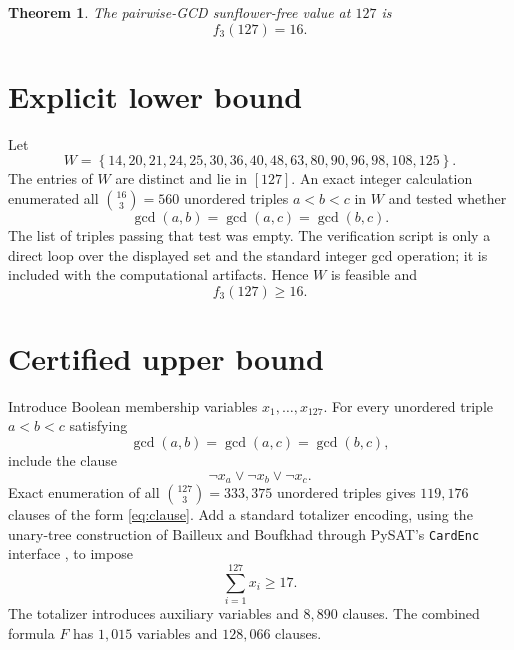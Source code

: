 \documentclass[11pt]{article}
\newtheorem{theorem}{Theorem}
\newcommand{\set}[1]{\left\{#1\right\}}
\begin{document}
\begin{theorem}\label{thm:main}
The pairwise-GCD sunflower-free value at $127$ is
\[
 f_3(127)=16.
\]
\end{theorem}

\section{Explicit lower bound}

Let
\begin{equation}\label{eq:witness}
 W=\set{14,20,21,24,25,30,36,40,48,63,80,90,96,98,108,125}.
\end{equation}
The entries of $W$ are distinct and lie in $[127]$.  An exact integer
calculation enumerated all $\binom{16}{3}=560$ unordered triples
$a<b<c$ in $W$ and tested whether
\[
 \gcd(a,b)=\gcd(a,c)=\gcd(b,c).
\]
The list of triples passing that test was empty.  The verification script is
only a direct loop over the displayed set and the standard integer gcd
operation; it is included with the computational artifacts.  Hence $W$ is
feasible and
\begin{equation}\label{eq:lower}
 f_3(127)\geq16.
\end{equation}

\section{Certified upper bound}

Introduce Boolean membership variables $x_1,\ldots,x_{127}$.  For every
unordered triple $a<b<c$ satisfying
\begin{equation}\label{eq:bad}
 \gcd(a,b)=\gcd(a,c)=\gcd(b,c),
\end{equation}
include the clause
\begin{equation}\label{eq:clause}
 \neg x_a\lor\neg x_b\lor\neg x_c.
\end{equation}
Exact enumeration of all $\binom{127}{3}=333{,}375$ unordered triples gives
$119{,}176$ clauses of the form \eqref{eq:clause}.  Add a standard totalizer
encoding, using the unary-tree construction of Bailleux and Boufkhad
\cite[Sections~2.2--2.3]{BailleuxBoufkhad2003} through PySAT's
\texttt{CardEnc} interface \cite{IgnatievEtAl2018}, to impose
\begin{equation}\label{eq:card}
 \sum_{i=1}^{127}x_i\geq17.
\end{equation}
The totalizer introduces auxiliary variables and $8{,}890$ clauses.  The
combined formula $F$ has $1{,}015$ variables and $128{,}066$ clauses.
\end{document}
